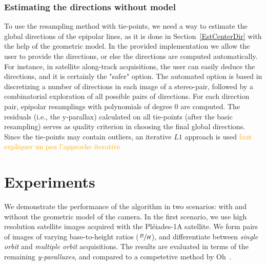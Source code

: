 \documentclass{ipol}
\newcommand{\er}[1]{\textcolor{orange}{#1}}
\newcommand{\mpd}[1]{\textcolor{magenta}{#1}}
\begin{document}
\subsubsection{Estimating the directions without model}
%
To use the resampling method with tie-points, we need a way to estimate the global directions of the epipolar lines, as it is done in Section~\ref{EstCenterDir} with the help of the geometric model. In the provided implementation we allow the user to provide the directions, or else the directions are computed automatically. For instance, in satellite along-track acquisitions, the user can easily deduce the directions, and it is certainly the "safer" option. The automated option is based in discretizing a number of directions in each image of a stereo-pair, followed by a combinatorial exploration of all possible pairs of directions. For each direction pair, epipolar resamplings with polynomials of degree $0$ are computed. The residuals (i.e., the y-parallax) calculated on all tie-points (after the basic resampling) serves as quality criterion in choosing the final global directions. Since the tie-points may contain outliers, an iterative $L1$ approach is used \er{faut expliquer un peu l'approche iterative}






\section{Experiments}\label{sec:experiments}

We demonstrate the performance of the algorithm in two scenarios: with and without the geometric model of the camera. In the first scenario, we use high resolution satellite images acquired with the Pl\'eiades-1A satellite. We form pairs of images of varying base-to-height ratios ($\sfrac{B}{H}$), and differentiate between \textit{single orbit} and \textit{multiple orbit} acquisitions. The results are evaluated in terms of the remaining \textit{y-parallaxes}, and compared to a competetive method by Oh~\cite{Oh2011}. 
 
\end{document}
